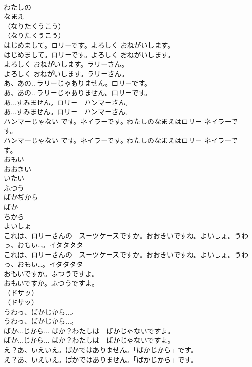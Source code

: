 \documentclass[8pt]{extreport}
\begin{document}
\begin{CJK}{UTF8}{min}
\\	わたしの
\\	なまえ
\\	（なりたくうこう）	
\\	（なりたくうこう） 
\\	はじめまして。ロリーです。よろしく おねがいします。	
\\	はじめまして。ロリーです。よろしく おねがいします。 
\\	よろしく おねがいします。ラリーさん。	
\\	よろしく おねがいします。ラリーさん。 
\\	あ、あの...ラリーじゃありません。ロリーです。	
\\	あ、あの...ラリーじゃありません。ロリーです。 
\\	あ...すみません。ロリー　ハンマーさん。	
\\	あ...すみません。ロリー　ハンマーさん。 
\\	ハンマーじゃない です。ネイラーです。わたしのなまえはロリー ネイラーです。	
\\	ハンマーじゃない です。ネイラーです。わたしのなまえはロリー ネイラーです。 
\\	おもい
\\	おおきい
\\	いたい
\\	ふつう
\\	ばかぢから
\\	ばか
\\	ちから
\\	よいしょ
\\	これは、ロリーさんの　スーツケースですか。おおきいですね。よいしょ。うわっ、おもい…。イタタタタ	
\\	これは、ロリーさんの　スーツケースですか。おおきいですね。よいしょ。うわっ、おもい…。イタタタタ 
\\	おもいですか。ふつうですよ。	
\\	おもいですか。ふつうですよ。 
\\	（ドサッ）	
\\	（ドサッ） 
\\	うわっ、ばかじから...。	
\\	うわっ、ばかじから...。 
\\	ばか...じから... ばか？わたしは　ばかじゃないですよ。	
\\	ばか...じから... ばか？わたしは　ばかじゃないですよ。 
\\	え？あ、いえいえ。ばかではありません。「ばかじから」です。	
\\	え？あ、いえいえ。ばかではありません。「ばかじから」です。 

\end{CJK}
\end{document}
